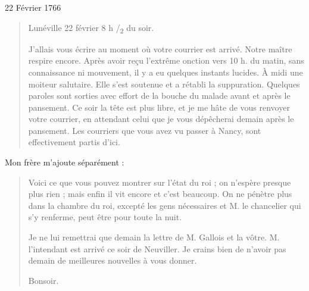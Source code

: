 \begin{diary}{22 Février 1766}{}
                        \begin{quote}\begin{flushright}Lunéville
                              22 février 8 h /\textsubscript{2} du
                                 soir.\end{flushright}
                              J'allais vous écrire au moment où votre
                              courrier est arrivé. Notre maître
                                 respire encore. Après avoir
                                 reçu l'extrême
                                 onction vers 10 h. du
                                    matin, sans connaissance
                                 ni mouvement, il y a eu quelques instants
                                 lucides. À midi une moiteur salutaire.
                                 Elle
                                 s'est soutenue et a rétabli la suppuration.
                                 Quelques paroles sont sorties avec effort de la
                                 bouche du malade avant et après le pansement.
                              Ce soir la tête est plus libre, et je me hâte
                              de vous renvoyer votre courrier, en attendant
                              celui que je vous dépêcherai demain après
                              le pansement. Les courriers que vous avez
                              vu passer à Nancy, sont
                              effectivement partis d'ici. \bigskip

        \end{quote}

                           Mon frère m'ajoute séparément : \bigskip


                        \begin{quote}\begin{flushright}\end{flushright}
                              Voici ce que vous pouvez montrer sur l'état
                              du roi ; on n'espère
                              presque plus rien ; mais
                              enfin il vit encore et c'est beaucoup. On ne
                              pénètre plus dans la chambre du roi, excepté
                              les gens nécessaires et M. le
                                 chancelier qui
                              s'y renferme, peut être pour toute la nuit. \bigskip

         Je ne lui remettrai que demain la lettre
                              de M. Gallois et la vôtre.
                                 M. l'intendant
                              est arrivé ce soir de Neuviller. Je crains
                              bien de n'avoir pas demain de meilleures
                              nouvelles à vous donner. \bigskip

         Bonsoir. \bigskip

        \end{quote}
                     \end{diary}

